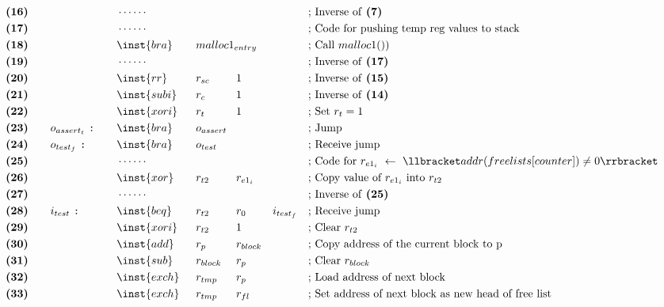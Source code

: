 {\begin{alignat*}{7}
    &\textbf{(16)}\quad&& &&\cdots\cdots && && && &&\text{; Inverse of \textbf{(7)}}\\
    &\textbf{(17)}\quad&& &&\cdots\cdots && && && &&\text{; Code for pushing temp reg values to stack}\\
    &\textbf{(18)}\quad&& &&\inst{bra}\quad &&malloc1_{entry} \span\omit\span\quad \span\omit\span\quad && \text{; Call $malloc1()$)}\\
    &\textbf{(19)}\quad&& &&\cdots\cdots && && && &&\text{; Inverse of \textbf{(17)}}\\
    &\textbf{(20)}\quad&& &&\inst{rr} &&r_{sc}\ && 1 && && \text{; Inverse of \textbf{(15)}}\\
    &\textbf{(21)}\quad&& &&\inst{subi} &&r_{c} && 1 && && \text{; Inverse of \textbf{(14)}}\\
    &\textbf{(22)}\quad&& &&\inst{xori} &&r_t && 1 && && \text{; Set $r_t = 1$}\\
    &\textbf{(23)}\quad&&o_{assert_t}\ \texttt{:}\quad &&\inst{bra} &&o_{assert} \span\omit\span\quad \span\omit\span\quad && \text{; Jump}\\
    &\textbf{(24)}\quad&&o_{test_f}\ \texttt{:}\quad &&\inst{bra} &&o_{test} \span\omit\span\quad \span\omit\span\quad && \text{; Receive jump}\\
    &\textbf{(25)}\quad&& &&\cdots\cdots && && && &&\text{; Code for $r_{e1_i}\ \leftarrow\ \llbracket addr(freelists[counter]) \neq 0 \rrbracket$}\\
    &\textbf{(26)}\quad&& &&\inst{xor}\quad &&r_{t2} && r_{e1_i} && &&\text{; Copy value of $r_{e1_i}$ into $r_{t2}$}\\        
    &\textbf{(27)}\quad&& &&\cdots\cdots && && && &&\text{; Inverse of \textbf{(25)}}\\
    &\textbf{(28)}\quad&&i_{test}\ \texttt{:}\quad &&\inst{beq} &&r_{t2} && r_0 && i_{test_f} && \text{; Receive jump}\\
    &\textbf{(29)}\quad&& &&\inst{xori} &&r_{t2} && 1 && && \text{; Clear $r_{t2}$}\\
    &\textbf{(30)}\quad&& &&\inst{add} &&r_{p} && r_{block} && && \text{; Copy address of the current block to p}\\
    &\textbf{(31)}\quad&& &&\inst{sub} &&r_{block}\ && r_{p} && && \text{; Clear $r_{block}$}\\
    &\textbf{(32)}\quad&& &&\inst{exch} &&r_{tmp} && r_{p} && && \text{; Load address of next block}\\
    &\textbf{(33)}\quad&& &&\inst{exch} &&r_{tmp} && r_{fl} && && \text{; Set address of next block as new head of free list}\\

\end{alignat*}}
